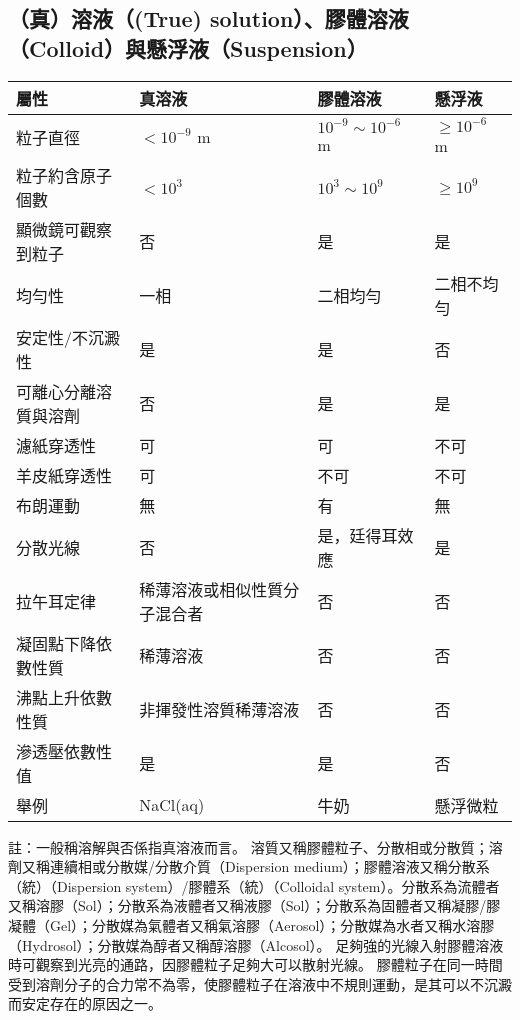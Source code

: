\documentclass[a4paper,12pt]{article}
\begin{document}
\subsection{（真）溶液（(True) solution）、膠體溶液（Colloid）與懸浮液（Suspension）}
\begin{longtable}[c]{|p{0.2\tw}|p{0.2\tw}|p{0.2\tw}|p{0.2\tw}|}
    \hline
    \textbf{屬性} & \textbf{真溶液} & \textbf{膠體溶液} & \textbf{懸浮液} \\
    \hline
    \endhead
    粒子直徑 & $<10^{-9}$ m & $10^{-9} \sim 10^{-6}$ m & $\geq 10^{-6}$ m \\
    \hline
    粒子約含原子個數 & $<10^3$ & $10^3 \sim 10^9$ & $\geq 10^9$ \\
    \hline
    顯微鏡可觀察到粒子 & 否 & 是 & 是 \\
    \hline
    均勻性 & 一相 & 二相均勻 & 二相不均勻 \\
    \hline
    安定性/不沉澱性 & 是 & 是 & 否 \\
    \hline
    可離心分離溶質與溶劑 & 否 & 是 & 是\\
    \hline
    濾紙穿透性 & 可 & 可 & 不可 \\
    \hline
    羊皮紙穿透性 & 可 & 不可 & 不可 \\
    \hline
    布朗運動 & 無 & 有 & 無 \\
    \hline
    分散光線 & 否 & 是，廷得耳效應 & 是 \\
    \hline
    拉午耳定律 & 稀薄溶液或相似性質分子混合者 & 否 & 否 \\
\hline
凝固點下降依數性質 & 稀薄溶液 & 否 & 否 \\
    \hline
    沸點上升依數性質 & 非揮發性溶質稀薄溶液 & 否 & 否 \\
    \hline
    滲透壓依數性值 & 是 & 是 & 否 \\
    \hline
    舉例 & NaCl(aq) & 牛奶 & 懸浮微粒 \\
    \hline
\end{longtable}
\FB
註：一般稱溶解與否係指真溶液而言。
溶質又稱膠體粒子、分散相或分散質；溶劑又稱連續相或分散媒/分散介質（Dispersion
medium）；膠體溶液又稱分散系（統）（Dispersion
system）/膠體系（統）（Colloidal system）。分散系為流體者又稱溶膠（Sol）；分散系為液體者又稱液膠（Sol）；分散系為固體者又稱凝膠/膠凝體（Gel）；分散媒為氣體者又稱氣溶膠（Aerosol）；分散媒為水者又稱水溶膠（Hydrosol）；分散媒為醇者又稱醇溶膠（Alcosol）。
足夠強的光線入射膠體溶液時可觀察到光亮的通路，因膠體粒子足夠大可以散射光線。
膠體粒子在同一時間受到溶劑分子的合力常不為零，使膠體粒子在溶液中不規則運動，是其可以不沉澱而安定存在的原因之一。
\end{document}
